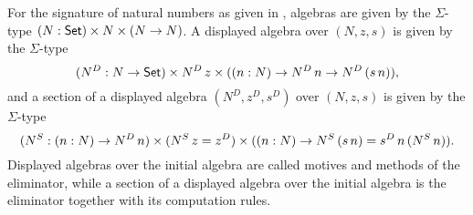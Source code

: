 \documentclass[a4paper,UKenglish,cleveref, autoref]{lipics-v2019}
\begin{document}
\begin{example}\label{ex:adsnat}
  For the signature of natural numbers as given in
  , algebras are given by the $\Sigma$-type
  $(N:\mathsf{Set})\times N\times(N\rightarrow N)$. A displayed algebra over $(N,z,s)$
  is given by the $\Sigma$-type
  \[
    (N^D:N\rightarrow\mathsf{Set})\times N^D\,z \times((n:N)\rightarrow N^D\,n\rightarrow N^D\,(s\,n)),
  \]
  and a section of a displayed algebra $(N^D,z^D,s^D)$ over $(N,z,s)$
  is given by the $\Sigma$-type
  \[
    (N^S:(n:N)\rightarrow N^D\,n)\times (N^S\,z = z^D) \times((n:N)\rightarrow N^S\,(s\,n) = s^D\,n\,(N^S\,n)).
  \]
  Displayed algebras over the initial algebra are called motives and
  methods of the eliminator, while a section of a displayed algebra
  over the initial algebra is the eliminator together with its
  computation rules.
\end{example}
  
\end{document}
